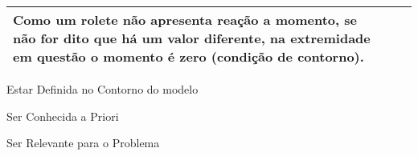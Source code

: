 \documentclass{article}
\begin{document}
\begin{table}[h]
\begin{tabularx}{\textwidth}{|X|X|X|}
                        \begin{minipage}{.3\textwidth}
                            \vspace{5px}
                            Como um rolete não apresenta reação a momento, \textbf{se não for dito que há um valor diferente}, na extremidade em questão o momento é zero (condição de contorno).
                        \end{minipage} \\ \hline    
                \end{tabularx}
            \end{table}

            \begin{todolist}\tiny
                \item Estar Definida no Contorno do modelo 
                \item Ser Conhecida a Priori
                \item Ser Relevante para o Problema
            \end{todolist}
\end{document}
